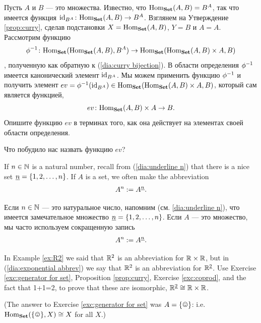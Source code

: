 \documentclass[CT4S-EN-RU]{subfiles}
\begin{document}
\begin{exerciseRUS}\label{exc:evaluation}
Пусть $A$ и $B$ — это множества. Известно, что $\textnormal{Hom}_{\mathbf{Set}}(A,B)=B^A$, так что имеется функция $\textnormal{id}_{B^A}\colon\textnormal{Hom}_{\mathbf{Set}}(A,B)\rightarrow B^A$. Взглянем на Утверждение \ref{prop:curry}, сделав подстановки $X=\textnormal{Hom}_{\mathbf{Set}}(A,B)$, $Y=B$ и  $A=A$. Рассмотрим функцию $$\phi^\m1\taking\Hom_\Set(\Hom_\Set(A,B),B^A)\to\Hom_\Set(\Hom_\Set(A,B)\times A,B)$$, полученную как обратную к (\ref{dia:curry bijection}). В области определения $\phi^\m1$ имеется канонический элемент $\textnormal{id}_{B^A}$. Мы можем применить функцию $\phi^\m1$ и получить элемент $ev=\phi^\m1(\id_{B^A})\in\Hom_\Set(\Hom_\Set(A,B)\times A,B)$, который сам является функцией, $$ev\colon\textnormal{Hom}_{\mathbf{Set}}(A,B)\times A\rightarrow B.$$ 
\sexc Опишите функцию $ev$ в терминах того, как она действует на элементах своей области определения. 
\item Что побудило нас назвать функцию $ev$?%
\endsexc
\end{exerciseRUS}

\begin{blockENG}
If $n\in{\mathbb N}$ is a natural number, recall from (\ref{dia:underline n}) that there is a nice set $\underline{n}=\{1,2,\ldots,n\}$. If $A$ is a set, we often make the abbreviation 
\begin{align}\label{dia:exponential abbrev}
A^n:=A^{\underline{n}}.
\end{align}
\end{blockENG}

\begin{blockRUS}
Если $n\in{\mathbb N}$ — это натуральное число, напомним (см. \ref{dia:underline n}), что имеется замечательное множество $\underline{n}=\{1,2,\ldots,n\}$. Если $A$ — это множество, мы часто используем сокращенную запись
\begin{align}\label{dia:exponential abbrev}
A^n:=A^{\underline{n}}.
\end{align}
\end{blockRUS}

\begin{exerciseENG}\label{exc:two R2s}
In Example \ref{ex:R2} we said that ${\mathbb R}^2$ is an abbreviation for ${\mathbb R}\times{\mathbb R}$, but in (\ref{dia:exponential abbrev}) we say that ${\mathbb R}^2$ is an abbreviation for ${\mathbb R}^{\underline{2}}$. Use Exercise \ref{exc:generator for set}, Proposition \ref{prop:curry}, Exercise \ref{exc:coprod}, and the fact that 1+1=2, to prove that these are isomorphic, ${\mathbb R}^{\underline{2}}\cong{\mathbb R}\times{\mathbb R}$.

(The answer to Exercise \ref{exc:generator for set} was $A=\singleton$: i.e. $\Hom_\Set(\singleton,X)\iso X$ for all $X$.)
\end{exerciseENG}
\end{document}
